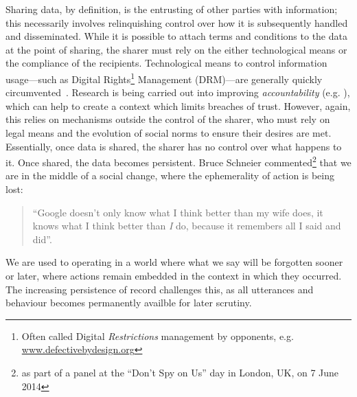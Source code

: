 \documentclass{IOS-Book-Article}     %
\newcommand{\tbox}[3][red]{{
\color{#1}\noindent{
   \fbox{\scriptsize{ {\bf #2} \textsl{#3}}}
   \vspace{2pt}
}
}}
\newcommand{\todo}[1]{\tbox{TODO:}{#1}}
\begin{document}
Sharing data, by definition, is the entrusting of other parties with
information; this necessarily involves relinquishing control over how it is
subsequently handled and disseminated. While it is possible to attach terms and
conditions to the data at the point of sharing, the sharer must rely on the
either technological means or the compliance of the recipients. Technological
means to control information usage---such as Digital Rights\footnote{Often called Digital \emph{Restrictions}
management by opponents, e.g. \url{www.defectivebydesign.org}} Management
(DRM)---are generally quickly circumvented~\cite[p.6]{doctorow2008content}.
Research is being carried out into improving \emph{accountability} (e.g.
\cite{feigenbaum2011towards}), which can help to create a context which limits
breaches of trust. However, again, this relies on mechanisms outside the control
of the sharer, who must rely on legal means and the evolution of social norms
to ensure their desires are met.
Essentially,
once data is shared, the sharer has no control over what happens to it. 
Once shared, the data becomes persistent. Bruce Schneier commented\footnote{as
part of a panel at the ``Don't Spy on Us'' day in London, UK, on 7 June 2014}
that we are in the middle of a social change, where the ephemerality of
action is being lost:
\begin{quote}
``Google doesn't only know what I think better than my wife does, it
knows what I think better than \emph{I} do, because it remembers all I said and
did''.
\end{quote}
We are used to operating in a world where what we say will be forgotten
sooner or later, where actions remain embedded in the context in which they
occurred. The increasing persistence of record challenges this, as all
utterances and behaviour becomes permanently availble for later scrutiny.

\end{document}
